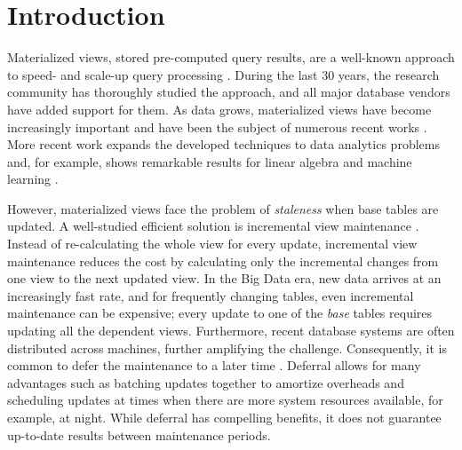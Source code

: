 \section{Introduction}
Materialized views, stored pre-computed query results, are a well-known approach to speed- and scale-up query processing \cite{LarsonY85, gupta1995maintenance, chirkova2011materialized, halevy2001answering}.
During the last 30 years, the research community has thoroughly studied the approach, and all major database vendors have added support for them. 
As data grows, materialized views have become increasingly important and have been the subject of numerous recent works \cite{lefevre2014opportunistic, bailis2014scalable, perez2014history}.
More recent work expands the developed techniques to data analytics problems and, for example, shows remarkable results for linear algebra and machine learning \cite{nikolic2014linview, zhang2014mat}.

However, materialized views face the problem of \emph{staleness} when base tables are updated. 
A well-studied efficient solution is incremental view maintenance \cite{gupta1995maintenance, chirkova2011materialized}.
Instead of re-calculating the whole view for every update, incremental view maintenance reduces the cost by calculating only the incremental changes from one view to the next updated view. 
In the Big Data era, new data arrives at an increasingly fast rate, and for frequently changing tables, even incremental maintenance can be expensive; every update to one of the {\em base} tables requires updating all the dependent views. 
Furthermore, recent database systems are often distributed across machines, further amplifying the challenge. 
Consequently, it is common to defer the maintenance to a later time \cite{chirkova2011materialized, zhou2007lazy}.
Deferral allows for many advantages such as batching updates together to amortize overheads and scheduling updates at times when there are more system resources available, for example, at night.
While deferral has compelling benefits, it does not guarantee up-to-date results between maintenance periods. 

